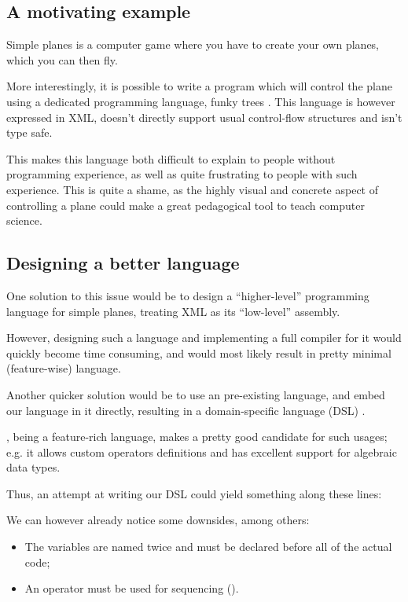 \subsection{A motivating example}

Simple planes \cite{simplePlanes} is a computer game where you have to create your own planes, which you can then fly.

More interestingly, it is possible to write a program which will control the plane using a dedicated programming language, 
funky trees \cite{funkyTrees}.
This language is however expressed in XML,
doesn't directly support usual control-flow structures
and isn't type safe.

This makes this language both difficult to explain to people without programming experience, as well as quite frustrating to people with such experience.
This is quite a shame,
as the highly visual and concrete aspect of controlling a plane could make a great pedagogical tool to teach computer science.

\subsection{Designing a better language}
One solution to this issue would be to design a 
``higher-level'' programming language for simple planes,
treating XML as its ``low-level'' assembly.

However, designing such a language and implementing a full compiler for it
would quickly become time consuming, and would most likely result in pretty minimal (feature-wise) language.

Another quicker solution would be to use an pre-existing language,
and embed our language in it directly, resulting in a domain-specific language (DSL) \cite{langAndTools}.

\Scala{}, being a feature-rich language, makes a pretty good candidate for such usages;
e.g. it allows custom operators definitions and has excellent support for algebraic data types.

Thus, an attempt at writing our DSL could yield something along these lines:


We can however already notice some downsides, among others:
\begin{itemize}
    \item The variables are named twice and must be declared before all of the actual code;
    \item An operator must be used for sequencing ().
\end{itemize}

